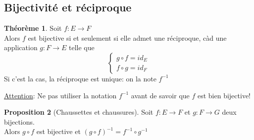 \documentclass[10pt,a4paper]{article}
\theoremstyle{definition}
\newtheorem{proposition}{Proposition}[section]
\newtheorem{theorem}[proposition]{Théorème}
\begin{document}
\subsection{Bijectivité et réciproque}
\begin{theorem}
Soit $f: E \to F$ \\
Alors $f$ est bijective si et seulement si elle admet une réciproque, càd une application $g: F \to E$ telle que
\[\begin{cases}
g \circ f = id_E \\
f \circ g = id_F
\end{cases} \]
Si c'est la cas, la réciproque est unique: on la note $f^{-1}$
\end{theorem}
\noindent \uline{Attention}: Ne pas utiliser la notation $f^{-1}$ avant de savoir que $f$ est bien bijective!
\begin{proposition}[Chaussettes et chaussures]
Soit $f: E \to F$ et $g: F \to G$ deux bijections. \\
Alors $g \circ f$ est bijective et $(g \circ f)^{-1} = f^{-1} \circ g^{-1}$
\end{proposition}
\end{document}
